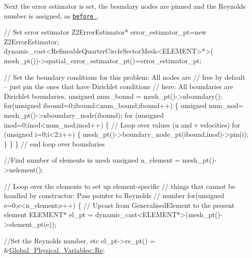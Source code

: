 Next the error estimator is set, the boundary nodes are pinned and the Reynolds number is assigned, as \href{../../adaptive_driven_cavity/html/index.html#constructor}{\tt before }.


\begin{DoxyCodeInclude}
 
 \textcolor{comment}{// Set error estimator}
 Z2ErrorEstimator* error\_estimator\_pt=\textcolor{keyword}{new} Z2ErrorEstimator;
 \textcolor{keyword}{dynamic\_cast<}RefineableQuarterCircleSectorMesh<ELEMENT>*\textcolor{keyword}{>}(
  mesh\_pt())->spatial\_error\_estimator\_pt()=error\_estimator\_pt;
 
 \textcolor{comment}{// Set the boundary conditions for this problem: All nodes are}
 \textcolor{comment}{// free by default -- just pin the ones that have Dirichlet conditions}
 \textcolor{comment}{// here: All boundaries are Dirichlet boundaries.}
 \textcolor{keywordtype}{unsigned} num\_bound = mesh\_pt()->nboundary();
 \textcolor{keywordflow}{for}(\textcolor{keywordtype}{unsigned} ibound=0;ibound<num\_bound;ibound++)
  \{
   \textcolor{keywordtype}{unsigned} num\_nod= mesh\_pt()->nboundary\_node(ibound);
   \textcolor{keywordflow}{for} (\textcolor{keywordtype}{unsigned} inod=0;inod<num\_nod;inod++)
    \{
     \textcolor{comment}{// Loop over values (u and v velocities)}
     \textcolor{keywordflow}{for} (\textcolor{keywordtype}{unsigned} i=0;i<2;i++)
      \{
       mesh\_pt()->boundary\_node\_pt(ibound,inod)->pin(i); 
      \}
    \}
  \} \textcolor{comment}{// end loop over boundaries}

 \textcolor{comment}{//Find number of elements in mesh}
 \textcolor{keywordtype}{unsigned} n\_element = mesh\_pt()->nelement();

 \textcolor{comment}{// Loop over the elements to set up element-specific }
 \textcolor{comment}{// things that cannot be handled by constructor: Pass pointer to Reynolds}
 \textcolor{comment}{// number}
 \textcolor{keywordflow}{for}(\textcolor{keywordtype}{unsigned} e=0;e<n\_element;e++)
  \{
   \textcolor{comment}{// Upcast from GeneralisedElement to the present element}
   ELEMENT* el\_pt = \textcolor{keyword}{dynamic\_cast<}ELEMENT*\textcolor{keyword}{>}(mesh\_pt()->element\_pt(e));

   \textcolor{comment}{//Set the Reynolds number, etc}
   el\_pt->re\_pt() = &\hyperlink{namespaceGlobal__Physical__Variables_ab814e627d2eb5bc50318879d19ab16b9}{Global\_Physical\_Variables::Re};

\end{DoxyCodeInclude}


